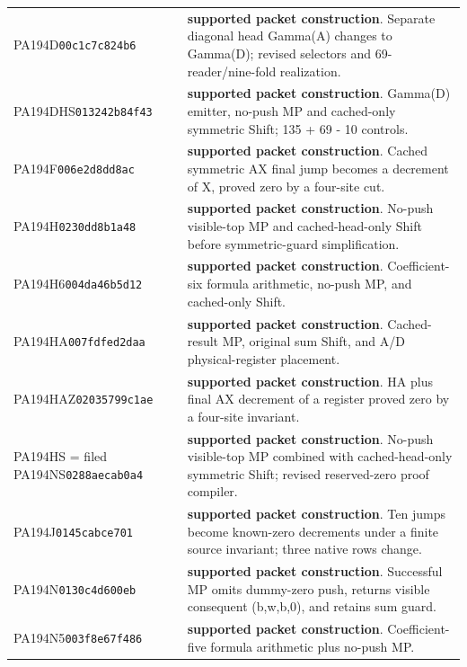 \begin{longtable}{p{.28\linewidth}p{.64\linewidth}}
PA194D\newline\texttt{00c1c7c824b6} & \textbf{supported packet construction}. Separate diagonal head Gamma(A) changes to Gamma(D); revised selectors and 69-reader/nine-fold realization.\\[5pt]
PA194DHS\newline\texttt{013242b84f43} & \textbf{supported packet construction}. Gamma(D) emitter, no-push MP and cached-only symmetric Shift; 135 + 69 - 10 controls.\\[5pt]
PA194F\newline\texttt{006e2d8dd8ac} & \textbf{supported packet construction}. Cached symmetric AX final jump becomes a decrement of X, proved zero by a four-site cut.\\[5pt]
PA194H\newline\texttt{0230dd8b1a48} & \textbf{supported packet construction}. No-push visible-top MP and cached-head-only Shift before symmetric-guard simplification.\\[5pt]
PA194H6\newline\texttt{004da46b5d12} & \textbf{supported packet construction}. Coefficient-six formula arithmetic, no-push MP, and cached-only Shift.\\[5pt]
PA194HA\newline\texttt{007fdfed2daa} & \textbf{supported packet construction}. Cached-result MP, original sum Shift, and A/D physical-register placement.\\[5pt]
PA194HAZ\newline\texttt{02035799c1ae} & \textbf{supported packet construction}. HA plus final AX decrement of a register proved zero by a four-site invariant.\\[5pt]
PA194HS = filed PA194NS\newline\texttt{0288aecab0a4} & \textbf{supported packet construction}. No-push visible-top MP combined with cached-head-only symmetric Shift; revised reserved-zero proof compiler.\\[5pt]
PA194J\newline\texttt{0145cabce701} & \textbf{supported packet construction}. Ten jumps become known-zero decrements under a finite source invariant; three native rows change.\\[5pt]
PA194N\newline\texttt{0130c4d600eb} & \textbf{supported packet construction}. Successful MP omits dummy-zero push, returns visible consequent (b,w,b,0), and retains sum guard.\\[5pt]
PA194N5\newline\texttt{003f8e67f486} & \textbf{supported packet construction}. Coefficient-five formula arithmetic plus no-push MP.\\[5pt]

\end{longtable}
